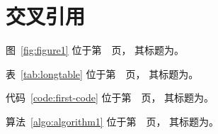 \chapter{交叉引用}

图~\ref{fig:figure1} 位于第~\pageref{fig:figure1}~页，
其标题为。

表~\ref{tab:longtable} 位于第~\pageref{tab:longtable}~页，
其标题为。

代码~\ref{code:first-code} 位于第~\pageref{code:first-code}~页，
其标题为。

算法~\ref{algo:algorithm1} 位于第~\pageref{algo:algorithm1}~页，
其标题为。
